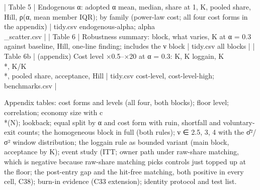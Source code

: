 | Table 5 | Endogenous α: adopted α mean, median, share at 1, K, pooled share, Hill, ρ(α, mean member IQR); by family (power-law cost; all four cost forms in the appendix) | tidy.csv endogenous-alpha; alpha\\_scatter.csv |
| Table 6 | Robustness summary: block, what varies, K at α = 0.3 against baseline, Hill, one-line finding; includes the ν block | tidy.csv all blocks |
| Table 6b | (appendix) Cost level ×0.5–×20 at α = 0.3: K, K loggain, K\\*, K/K\\*, pooled share, acceptance, Hill | tidy.csv cost-level, cost-level-high; benchmarks.csv |

Appendix tables: cost forms and levels (all four, both blocks); floor level; correlation; economy size with c\\*(N); lookback; equal split by α and cost form with ruin, shortfall and voluntary-exit counts; the homogeneous block in full (both rules); ν ∈ {2.5, 3, 4} with the σ̂²/σ² window distribution; the loggain rule as bounded variant (main block, acceptance by K); event study (ITT; owner path under raw-share matching, which is negative because raw-share matching picks controls just topped up at the floor; the post-entry gap and the hit-free matching, both positive in every cell, C38); burn-in evidence (C33 extension); identity protocol and test list.

\fi
